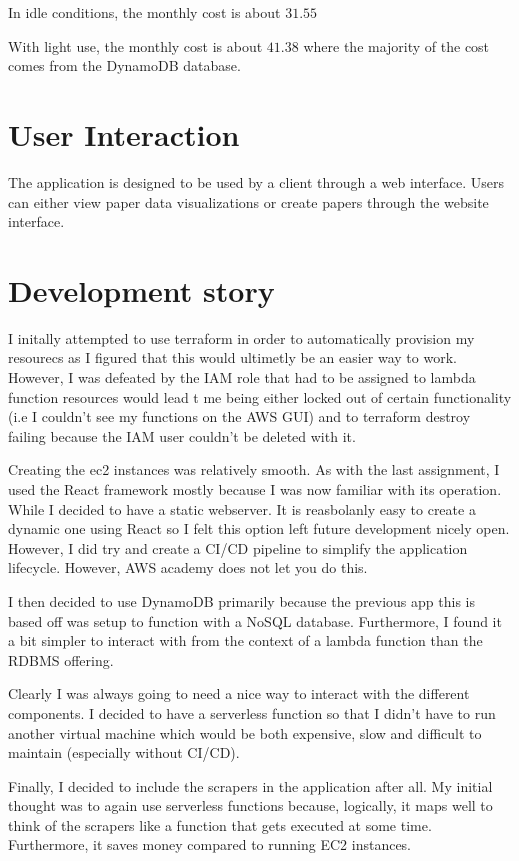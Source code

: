 \documentclass[12pt]{article}
\begin{document}
In idle conditions, the monthly cost is about $31.55$

With light use, the monthly cost is about $41.38$ where the majority of the cost comes from the DynamoDB database.

\section{User Interaction}

The application is designed to be used by a client through a web interface. Users can either view paper data visualizations or create papers through the website interface. 


\section{Development story}

I initally attempted to use terraform in order to automatically provision my resourecs as I figured that this would ultimetly be an easier way to work.
However, I was defeated by the IAM role that had to be assigned to lambda function resources would lead t me being either locked out of certain functionality (i.e I couldn't see my functions on the AWS GUI) and to terraform destroy failing because the IAM user couldn't be deleted with it.

Creating the ec2 instances was relatively smooth. As with the last assignment, I used the React framework mostly because I was now familiar with its operation. While I decided to have a static webserver. It is reasbolanly easy to create a dynamic one using React so I felt this option left future development nicely open.
However, I did try and create a CI/CD pipeline to simplify the application lifecycle. However, AWS academy does not let you do this.

I then decided to use DynamoDB primarily because the previous app this is based off was setup to function with a NoSQL database. Furthermore, I found it a bit simpler to interact with from the context of a lambda function than the RDBMS offering.

Clearly I was always going to need a nice way to interact with the different components. I decided to have a serverless function so that I didn't have to run another virtual machine which would be both expensive, slow and difficult to maintain (especially without CI/CD).

Finally, I decided to include the scrapers in the application after all. My initial thought was to again use serverless functions because, logically, it maps well to think of the scrapers like a function that gets executed at some time. Furthermore, it saves money compared to running EC2 instances.
\end{document}
